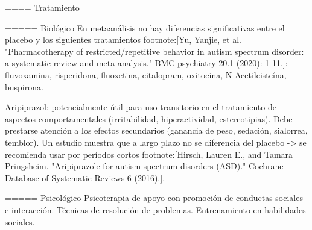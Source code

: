 ==== Tratamiento

===== Biológico
En metaanálisis no hay diferencias significativas entre el placebo y los siguientes tratamientos footnote:[Yu, Yanjie, et al. "Pharmacotherapy of restricted/repetitive behavior in autism spectrum disorder: a systematic review and meta-analysis." BMC psychiatry 20.1 (2020): 1-11.]: fluvoxamina, risperidona, fluoxetina, citalopram, oxitocina, N-Acetilcisteína, buspirona.

Aripiprazol: potencialmente útil para uso transitorio en el tratamiento de aspectos comportamentales (irritabilidad, hiperactividad, estereotipias). Debe prestarse atención a los efectos secundarios (ganancia de peso, sedación, sialorrea, temblor). Un estudio muestra que a largo plazo no se diferencia del placebo -> se recomienda usar por períodos cortos footnote:[Hirsch, Lauren E., and Tamara Pringsheim. "Aripiprazole for autism spectrum disorders (ASD)." Cochrane Database of Systematic Reviews 6 (2016).].

===== Psicológico
Psicoterapia de apoyo con promoción de conductas sociales e interacción.
Técnicas de resolución de problemas.
Entrenamiento en habilidades sociales.
